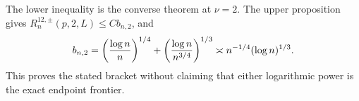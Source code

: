 The lower inequality is the converse theorem at \(\nu=2\).  The upper proposition gives \(R^{12,\pm}_n(p,2,L)\leq Cb_{n,2}\), and
\[
 b_{n,2}=\left({\log n\over n}\right)^{1/4}
 +\left({\log n\over n^{3/4}}\right)^{1/3}
 \asymp n^{-1/4}(\log n)^{1/3}.
\]
This proves the stated bracket without claiming that either logarithmic power is the exact endpoint frontier.